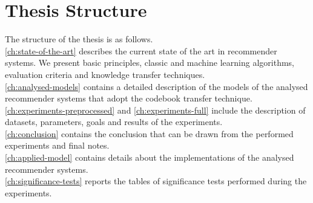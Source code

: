 \section{Thesis Structure}

The structure of the thesis is as follows.\\
\autoref{ch:state-of-the-art} describes the current state of the art in recommender systems. We present basic principles, classic and machine learning algorithms, evaluation criteria and knowledge transfer techniques.\\
\autoref{ch:analysed-models} contains a detailed description of the models of the analysed recommender systems that adopt the codebook transfer technique.\\
\autoref{ch:experiments-preprocessed} and \autoref{ch:experiments-full} include the description of datasets, parameters, goals and results of the experiments.\\
\autoref{ch:conclusion} contains the conclusion that can be drawn from the performed experiments and final notes.\\
\autoref{ch:applied-model} contains details about the implementations of the analysed recommender systems.\\
\autoref{ch:significance-tests} reports the tables of significance tests performed during the experiments.